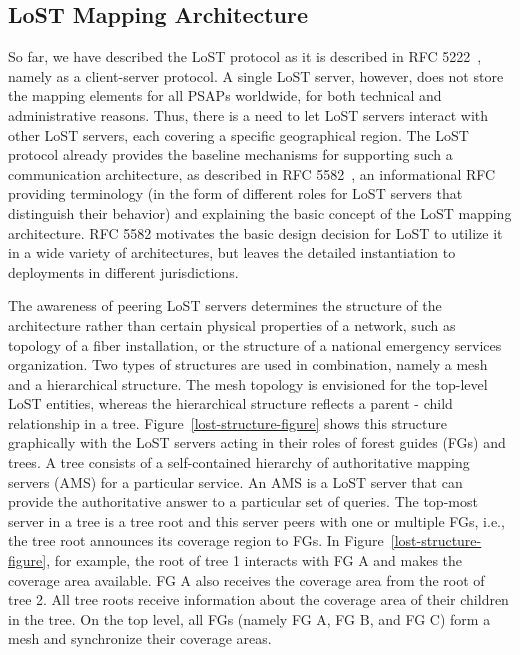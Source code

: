 \documentclass[12pt]{article}
\begin{document}
\subsection{LoST Mapping Architecture}
So far, we have described the LoST protocol as it is described in RFC 5222~\cite{rfc5222}, namely as a client-server protocol. A single LoST server, however, does not store the mapping elements for all PSAPs worldwide, for both technical and administrative reasons. Thus, there is a need to let LoST servers interact with other LoST servers, each covering a specific geographical region.  The LoST protocol already provides the baseline mechanisms for supporting such a communication architecture, as described in RFC 5582~\cite{rfc5582}, an informational RFC providing terminology (in the form of different roles for LoST servers that distinguish their behavior) and explaining the basic concept of the LoST mapping architecture. RFC 5582 motivates the basic design decision for LoST to utilize it in a wide variety of architectures, but leaves the detailed instantiation to deployments in different jurisdictions. 

The awareness of peering LoST servers  determines the structure of the architecture rather than certain physical properties of a network, such as topology of a fiber installation, or the structure of a national emergency services organization. Two types of structures are used in combination, namely a mesh and a hierarchical structure. The mesh topology is envisioned for the top-level LoST entities, whereas the hierarchical structure reflects a parent - child relationship in a tree. Figure~\ref{lost-structure-figure} shows this structure graphically with the LoST servers acting in their roles of forest guides (FGs) and trees. A tree consists of a self-contained hierarchy of authoritative mapping servers (AMS) for a particular service. An AMS is a LoST server that can provide the authoritative answer to a particular set of queries. The top-most server in a tree is a tree root and this server peers with one or multiple FGs, i.e., the tree root announces its coverage region to FGs. In Figure~\ref{lost-structure-figure}, for example, the root of tree 1 interacts with FG A and makes the coverage area available. FG A also receives the coverage area from the root of tree 2. All tree roots receive information about the coverage area of their children in the tree. On the top level, all FGs (namely FG A, FG B, and FG C) form a mesh and synchronize their coverage areas. 
\end{document}
